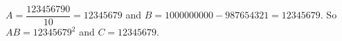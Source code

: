 $A=\dfrac{123456790}{10}=12345679$ and $B=1000000000-987654321=12345679$. So $AB=12345679^2$ and $C=\boxed{12345679}$.
